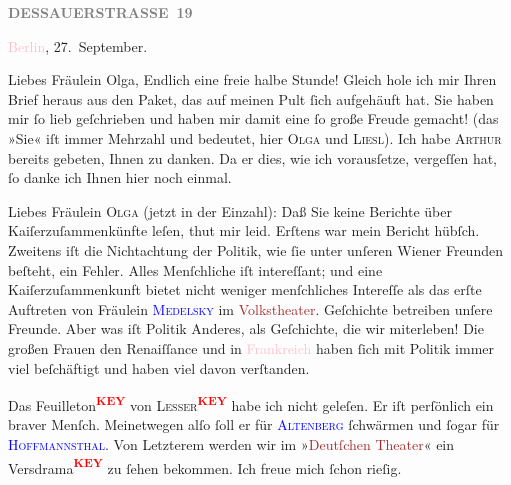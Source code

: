 \pstart
           \noindent{}\raggedleft{}{\pb}\textcolor{pink}{\textcolor{gray}{\textbf{DESSAUERSTRASSE 19}}}{}\ledrightnote{\textcolor{pink}{Dessauer Straße}}\pend
           
\pstart
           \centering{}\textcolor{pink}{Berlin}{}\ledrightnote{\textcolor{pink}{Berlin}}, 27. September.\pend
           
\pstart\center{}Liebes Fräulein Olga,\pend
\pstart
           Endlich eine freie halbe Stunde! Gleich hole ich mir Ihren Brief heraus aus den
               Paket, das auf meinen Pult ſich aufgehäuft hat. Sie haben mir ſo lieb geſchrieben und
               haben mir damit eine ſo große Freude gemacht! (das »Sie« iſt immer Mehrzahl und
               bedeutet, hier \textsc{Olga} und \textsc{Liesl}).
               Ich habe \textsc{Arthur} bereits gebeten, Ihnen zu danken. Da er
               dies, wie ich vorausſetze, vergeſſen hat, ſo danke ich Ihnen hier noch einmal.\pend
           
\pstart
           Liebes Fräulein \textsc{Olga} (jetzt in der Einzahl): Daß Sie keine
               Berichte über Kaiſerzuſammenkünfte leſen, thut mir leid. Erſtens war mein Bericht
               hübſch. Zweitens iſt die Nichtachtung {\pb}der Politik,
               wie ſie unter unſeren Wiener Freunden beſteht, ein Fehler. Alles Menſchliche iſt
               intereſſant; und  eine Kaiſerzuſammenkunft bietet
               nicht weniger menſchliches Intereſſe als das erſte Auftreten von Fräulein \textcolor{blue}{\textsc{Medelsky}}{}\ledrightnote{\textcolor{blue}{Lotte Medelsky}} im \textcolor{brown}{Volkstheater}{}\ledrightnote{\textcolor{brown}{Volkstheater}}. Geſchichte betreiben unſere Freunde. Aber was iſt
               Politik Anderes, als Geſchichte, die wir miterleben! Die großen Frauen den
               Renaiſſance und in \textcolor{pink}{Frankreich}{}\ledrightnote{\textcolor{pink}{Frankreich}} haben ſich mit Politik
               immer viel beſchäftigt und haben viel davon  verſtanden.\pend
           
\pstart
           Das Feuilleton\textcolor{red}{\textsuperscript{\textbf{KEY}}} von \textsc{Lesser}\textcolor{red}{\textsuperscript{\textbf{KEY}}} habe ich nicht geleſen. Er iſt
               perſönlich ein braver Menſch. Meinetwegen alſo ſoll er für \textcolor{blue}{\textsc{Altenberg}}{}\ledrightnote{\textcolor{blue}{Peter Altenberg}} ſchwärmen und ſogar für \textcolor{blue}{\textsc{Hoffmannsthal}}{}\ledrightnote{\textcolor{blue}{Hugo von Hofmannsthal}}. Von Letzterem
               werden wir im »\textcolor{brown}{Deutſchen Theater}{}\ledrightnote{\textcolor{brown}{Deutsches Theater Berlin}}« ein Versdrama\textcolor{red}{\textsuperscript{\textbf{KEY}}} zu ſehen bekommen. Ich freue mich ſchon rieſig.\pend
           
